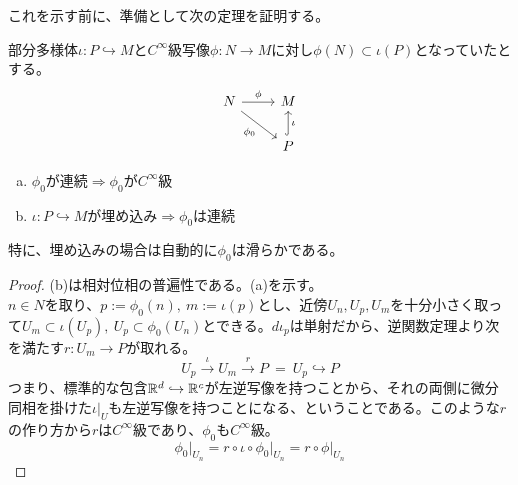 これを示す前に、準備として次の定理を証明する。
\begin{thm}
	部分多様体$\iota:P\hookrightarrow M$と$C^\infty$級写像$\phi:N\to M$に対し$\phi(N)\subset\iota(P)$となっていたとする。
	\[\begin{tikzcd}
	    N\arrow[r,"\phi"]\arrow[dr,"\phi_0"'] &M\\
	    & P\arrow[u,hook,"\iota"']
	\end{tikzcd}\]
	\begin{enumerate}[(a)]
	    \item $\phi_0$が連続$\Rightarrow \phi_0$が$C^\infty$級
	    \item $\iota:P\hookrightarrow M$が埋め込み$\Rightarrow \phi_0$は連続
	\end{enumerate}
\end{thm}
特に、埋め込みの場合は自動的に$\phi_0$は滑らかである。
\begin{proof}
    (b)は相対位相の普遍性である。(a)を示す。\\
    $n\in N$を取り、$p:=\phi_0(n),\ m:=\iota(p)$とし、近傍$U_n,U_p,U_m$を十分小さく取って$U_m\subset \iota(U_p),\ U_p\subset \phi_0(U_n)$とできる。$d\iota_p$は単射だから、逆関数定理より次を満たす$r:U_m\to P$が取れる。
    \[U_p\overset{\iota}{\longrightarrow}U_m\overset{r}{\longrightarrow}P\ =\ U_p\hookrightarrow P\]
    つまり、標準的な包含$\mathbb{R}^d\hookrightarrow\mathbb{R}^c$が左逆写像を持つことから、それの両側に微分同相を掛けた$\iota\lvert_U$も左逆写像を持つことになる、ということである。このような$r$の作り方から$r$は$C^\infty$級であり、$\phi_0$も$C^\infty$級。
    \[\phi_0\lvert_{U_n}=r\circ\iota\circ \phi_0\lvert_{U_n}=r\circ \phi\lvert_{U_n}\]
\end{proof}
